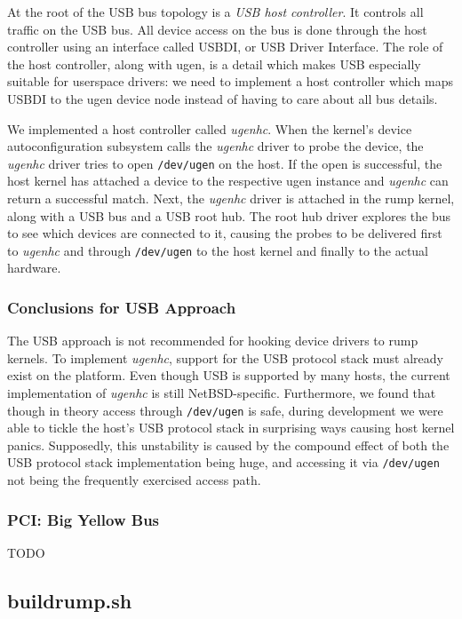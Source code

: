 At the root of the USB bus topology is a \textit{USB host controller}.
It controls all traffic on the USB bus.  All device access on the bus
is done through the host controller using an interface called USBDI, or
USB Driver Interface.  The role of the host controller, along with ugen,
is a detail which makes USB especially suitable for userspace drivers:
we need to implement a host controller which maps USBDI to the ugen
device node instead of having to care about all bus details.

We implemented a host controller called \textit{ugenhc}.  When
the kernel's device autoconfiguration subsystem calls the \textit{ugenhc}
driver to probe the device, the \textit{ugenhc} driver tries to open
\texttt{/dev/ugen} on the host.  If the open is successful, the
host kernel has attached a device to the respective ugen instance
and \textit{ugenhc} can return a successful match.  Next, the \textit{ugenhc}
driver is attached in the rump kernel, along with a USB bus and a
USB root hub.  The root hub driver explores the bus to see which
devices are connected to it, causing the probes to be delivered
first to \textit{ugenhc} and through \texttt{/dev/ugen} to the host
kernel and finally to the actual hardware.

\subsubsection*{Conclusions for USB Approach}

The USB approach is not recommended for hooking device drivers to rump
kernels.  To implement \textit{ugenhc}, support for the USB protocol
stack must already exist on the platform.  Even though USB is supported
by many hosts, the current implementation of \textit{ugenhc} is still
NetBSD-specific.  Furthermore, we found that though in theory access
through \texttt{/dev/ugen} is safe, during development we were able to
tickle the host's USB protocol stack in surprising ways causing host
kernel panics.  Supposedly, this unstability is caused by the compound
effect of both the USB protocol stack implementation being huge, and
accessing it via \texttt{/dev/ugen} not being the frequently exercised
access path.


\subsubsection{PCI: Big Yellow Bus}

TODO

\subsection{buildrump.sh}
\label{sect:buildrump.sh}

